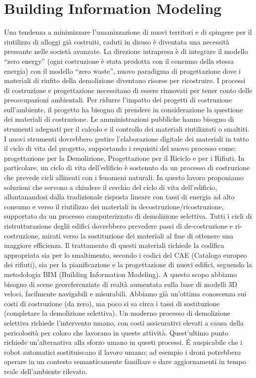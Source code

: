 \section{Building Information Modeling}
\label{sec:chapter_1_section_1}
\noindent

Una tendenza a minimizzare l'umanizzazione di nuovi territori e di spingere per il riutilizzo di alloggi
già costruiti, caduti in disuso è diventata una necessità pressante nelle società avanzate.
La direzione intrapresa è di integrare il modello ``zero energy'' (ogni costruzione è stata prodotta con il
consumo della stessa energia) con il modello ``zero waste'', nuovo paradigma di progettazione dove i materiali di
riufito della demolizione diventano risorse per ricostruire\cite{altamura:12}.
I processi di costruzione e progettazione necessitano di essere rinnovati per tener conto delle preoccupazioni
ambientali. Per ridurre l'impatto dei progetti di costruzione sull'ambiente, il progetto ha bisogno di prendere in
considerazione la questione dei materiali di costruzione.
Le amministrazioni pubbliche hanno bisogno di strumenti adeguati per il calcolo e il controllo dei materiali
riutilizzati o smaltiti.
I nuovi strumenti dovrebbero gestire l'elaborazione digitale dei materiali in tutto il ciclo di vita del progetto,
supportando i requisiti del nuovo processo come: progettazione per la Demolizione, Progettazione per il Riciclo e per i Rifiuti.
In particolare, un ciclo di vita dell'edificio è sostenuto da un processo di costruzione che prevede cicli allineati
con i fenomeni naturali.
In questo lavoro proponiamo soluzioni che servono a chiudere il cerchio del ciclo di vita dell'edificio, allontanandosi
dalla tradizionale risposta lineare con tassi di energia ad alto consumo e verso il riutilizzo
dei materiali in decostruzione/ricostruzione, supportato da un processo computerizzato di demolizione selettiva.
Tutti i cicli di ristrutturazione deglii edifici dovrebbero prevedere passi di de-costruzione e ri-costruzione, mirati
verso la sostituzione dei materiali al fine di ottenere una maggiore efficienza. Il trattamento di questi materiali
richiede la codifica appropriata sia per lo smaltimento, secondo i codici del CAE (Catalogo europeo dei rifiuti),
sia per la pianificazione e la progettazione di nuovi edifici, seguendo la metodologia BIM (Building Information Modeling).
A questo scopo abbiamo bisogno di scene georeferenziate di realtà aumentata sulla base di modelli 3D veloci,
facilmente navigabili e misurabili.
Abbiamo già un'ottima conoscenza sui costi di costruzione (da zero), ma poco si sa circa i tassi di sostituzione
(completare la demolizione selettiva). Un moderno processo di demolizione selettiva richiede l'intervento umano,
con costi assicurativi elevati a causa della pericolosità per coloro che lavorano in queste attività.
Quest'ultimo punto richiede un'alternativa alla sforzo umano in questi processi. \'E auspicabile che i robot automatici
sostituiscano il lavoro umano; ad esempio i droni potrebbero operare in un
contesto semanticamente familiare e dare aggiornamenti in tempo reale dell'ambiente rilevato.\\

